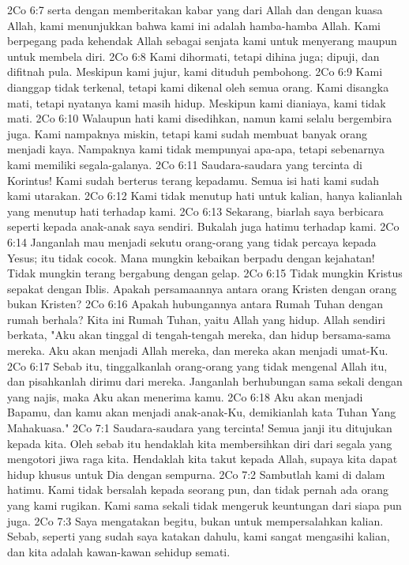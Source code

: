 2Co 6:7  serta dengan memberitakan kabar yang dari Allah dan dengan kuasa Allah, kami menunjukkan bahwa kami ini adalah hamba-hamba Allah. Kami berpegang pada kehendak Allah sebagai senjata kami untuk menyerang maupun untuk membela diri.
2Co 6:8  Kami dihormati, tetapi dihina juga; dipuji, dan difitnah pula. Meskipun kami jujur, kami dituduh pembohong.
2Co 6:9  Kami dianggap tidak terkenal, tetapi kami dikenal oleh semua orang. Kami disangka mati, tetapi nyatanya kami masih hidup. Meskipun kami dianiaya, kami tidak mati.
2Co 6:10  Walaupun hati kami disedihkan, namun kami selalu bergembira juga. Kami nampaknya miskin, tetapi kami sudah membuat banyak orang menjadi kaya. Nampaknya kami tidak mempunyai apa-apa, tetapi sebenarnya kami memiliki segala-galanya.
2Co 6:11  Saudara-saudara yang tercinta di Korintus! Kami sudah berterus terang kepadamu. Semua isi hati kami sudah kami utarakan.
2Co 6:12  Kami tidak menutup hati untuk kalian, hanya kalianlah yang menutup hati terhadap kami.
2Co 6:13  Sekarang, biarlah saya berbicara seperti kepada anak-anak saya sendiri. Bukalah juga hatimu terhadap kami.
2Co 6:14  Janganlah mau menjadi sekutu orang-orang yang tidak percaya kepada Yesus; itu tidak cocok. Mana mungkin kebaikan berpadu dengan kejahatan! Tidak mungkin terang bergabung dengan gelap.
2Co 6:15  Tidak mungkin Kristus sepakat dengan Iblis. Apakah persamaannya antara orang Kristen dengan orang bukan Kristen?
2Co 6:16  Apakah hubungannya antara Rumah Tuhan dengan rumah berhala? Kita ini Rumah Tuhan, yaitu Allah yang hidup. Allah sendiri berkata, "Aku akan tinggal di tengah-tengah mereka, dan hidup bersama-sama mereka. Aku akan menjadi Allah mereka, dan mereka akan menjadi umat-Ku.
2Co 6:17  Sebab itu, tinggalkanlah orang-orang yang tidak mengenal Allah itu, dan pisahkanlah dirimu dari mereka. Janganlah berhubungan sama sekali dengan yang najis, maka Aku akan menerima kamu.
2Co 6:18  Aku akan menjadi Bapamu, dan kamu akan menjadi anak-anak-Ku, demikianlah kata Tuhan Yang Mahakuasa."
2Co 7:1  Saudara-saudara yang tercinta! Semua janji itu ditujukan kepada kita. Oleh sebab itu hendaklah kita membersihkan diri dari segala yang mengotori jiwa raga kita. Hendaklah kita takut kepada Allah, supaya kita dapat hidup khusus untuk Dia dengan sempurna.
2Co 7:2  Sambutlah kami di dalam hatimu. Kami tidak bersalah kepada seorang pun, dan tidak pernah ada orang yang kami rugikan. Kami sama sekali tidak mengeruk keuntungan dari siapa pun juga.
2Co 7:3  Saya mengatakan begitu, bukan untuk mempersalahkan kalian. Sebab, seperti yang sudah saya katakan dahulu, kami sangat mengasihi kalian, dan kita adalah kawan-kawan sehidup semati.
